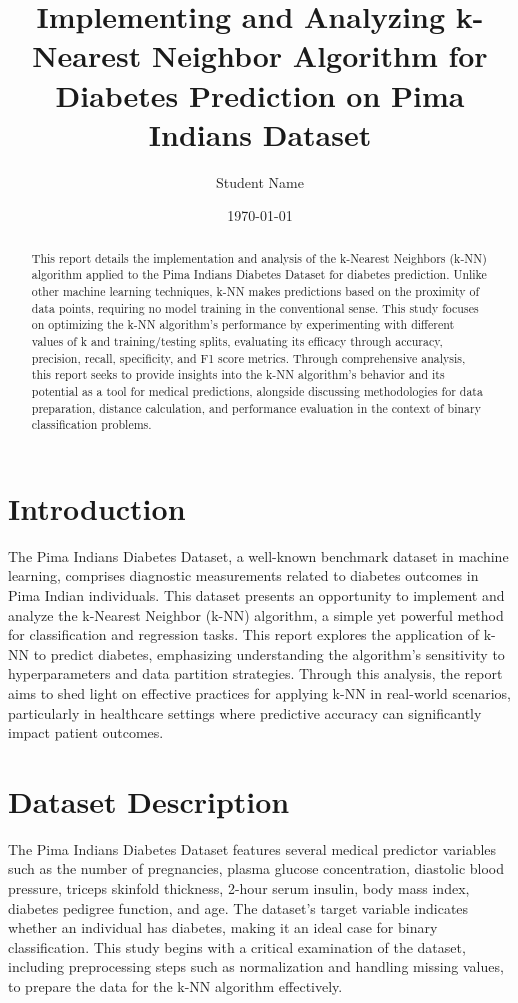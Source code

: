\documentclass[11pt, a4paper]{article}
\title{Implementing and Analyzing k-Nearest Neighbor Algorithm for Diabetes Prediction on Pima Indians Dataset}
\author{Student Name}
\date{\today}
\begin{document}
\maketitle

\begin{abstract}
This report details the implementation and analysis of the k-Nearest Neighbors (k-NN) algorithm applied to the Pima Indians Diabetes Dataset for diabetes prediction. Unlike other machine learning techniques, k-NN makes predictions based on the proximity of data points, requiring no model training in the conventional sense. This study focuses on optimizing the k-NN algorithm's performance by experimenting with different values of k and training/testing splits, evaluating its efficacy through accuracy, precision, recall, specificity, and F1 score metrics. Through comprehensive analysis, this report seeks to provide insights into the k-NN algorithm's behavior and its potential as a tool for medical predictions, alongside discussing methodologies for data preparation, distance calculation, and performance evaluation in the context of binary classification problems.
\end{abstract}

\section{Introduction}
The Pima Indians Diabetes Dataset, a well-known benchmark dataset in machine learning, comprises diagnostic measurements related to diabetes outcomes in Pima Indian individuals. This dataset presents an opportunity to implement and analyze the k-Nearest Neighbor (k-NN) algorithm, a simple yet powerful method for classification and regression tasks. This report explores the application of k-NN to predict diabetes, emphasizing understanding the algorithm's sensitivity to hyperparameters and data partition strategies. Through this analysis, the report aims to shed light on effective practices for applying k-NN in real-world scenarios, particularly in healthcare settings where predictive accuracy can significantly impact patient outcomes.

\section{Dataset Description}
The Pima Indians Diabetes Dataset features several medical predictor variables such as the number of pregnancies, plasma glucose concentration, diastolic blood pressure, triceps skinfold thickness, 2-hour serum insulin, body mass index, diabetes pedigree function, and age. The dataset's target variable indicates whether an individual has diabetes, making it an ideal case for binary classification. This study begins with a critical examination of the dataset, including preprocessing steps such as normalization and handling missing values, to prepare the data for the k-NN algorithm effectively.
\end{document}
